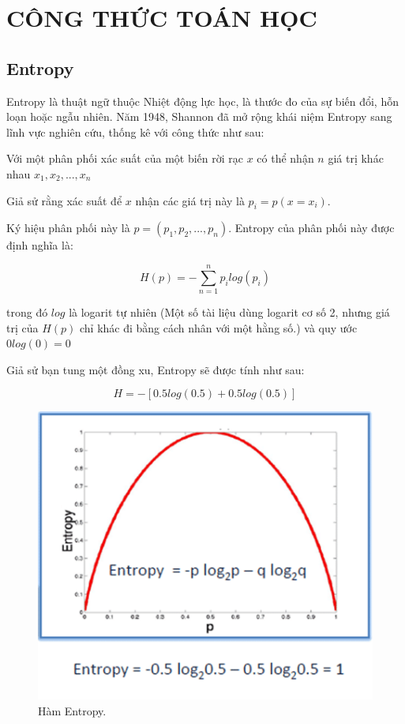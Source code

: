 \chapter{CÔNG THỨC TOÁN HỌC}

\section{Entropy}
Entropy là thuật ngữ thuộc Nhiệt động lực học, là thước đo của sự biến đổi,
hỗn loạn hoặc ngẫu nhiên.
Năm 1948, Shannon đã mở rộng khái niệm Entropy sang lĩnh vực nghiên cứu,
thống kê với công thức như sau:

Với một phân phối xác suất của một biến rời rạc $x$ có thể nhận $n$ giá trị
khác nhau $x_1, x_2,..., x_n$

Giả sử rằng xác suất để $x$ nhận các giá trị này là $p_i=p(x=x_i)$.

Ký hiệu phân phối này là $p=(p_1, p_2,..., p_n)$.
Entropy của phân phối này được định nghĩa là:

\begin{equation*}
    H(p)=-\sum_{n=1}^{n}p_ilog(p_i)
\end{equation*}

trong đó $log$ là logarit tự nhiên
(Một số tài liệu dùng logarit cơ số 2, nhưng giá trị của $H(p)$
chỉ khác đi bằng cách nhân với một hằng số.) và quy ước $0log(0)=0$

Giả sử bạn tung một đồng xu, Entropy sẽ được tính như sau:

\begin{equation*}
    H = -[0.5log(0.5) + 0.5log(0.5)]
\end{equation*}

\begin{center}
    \begin{figure}[ht!]
        \begin{center}
         \includegraphics[scale=0.7]{thesis/decision-tree/mathematical/dt_ex2.png}
        \end{center}
        \caption{Hàm Entropy.}
        \label{fig:dt_ex2}
    \end{figure}
\end{center}

